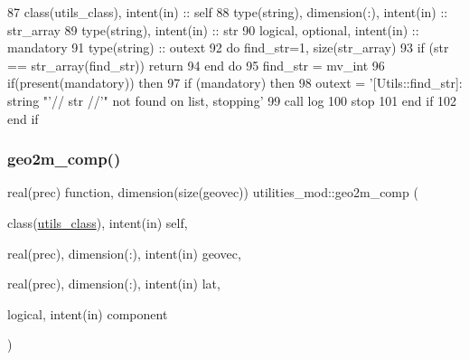 \begin{DoxyCode}
87     \textcolor{keywordtype}{class}(utils\_class), \textcolor{keywordtype}{intent(in)} :: self
88     \textcolor{keywordtype}{type}(string), \textcolor{keywordtype}{dimension(:)}, \textcolor{keywordtype}{intent(in)} :: str\_array
89     \textcolor{keywordtype}{type}(string), \textcolor{keywordtype}{intent(in)} :: str
90     \textcolor{keywordtype}{logical}, \textcolor{keywordtype}{optional}, \textcolor{keywordtype}{intent(in)} :: mandatory
91     \textcolor{keywordtype}{type}(string) :: outext
92     \textcolor{keywordflow}{do} find\_str=1, \textcolor{keyword}{size}(str\_array)
93         \textcolor{keywordflow}{if} (str == str\_array(find\_str)) \textcolor{keywordflow}{return}
94 \textcolor{keywordflow}{    end do}
95     find\_str = mv\_int
96     \textcolor{keywordflow}{if}(\textcolor{keyword}{present}(mandatory)) \textcolor{keywordflow}{then}
97         \textcolor{keywordflow}{if} (mandatory) \textcolor{keywordflow}{then}
98             outext = \textcolor{stringliteral}{'[Utils::find\_str]: string "'}// str //\textcolor{stringliteral}{'" not found on list, stopping'}
99             \textcolor{keyword}{call }log%
100             stop
101 \textcolor{keywordflow}{        end if}
102 \textcolor{keywordflow}{    end if}
\end{DoxyCode}
\mbox{\label{namespaceutilities__mod_aff2244d9152396064656f20f4936a18c}} 
\subsubsection{\texorpdfstring{geo2m\+\_\+comp()}{geo2m\_comp()}}
{\footnotesize\ttfamily real(prec) function, dimension(size(geovec)) utilities\+\_\+mod\+::geo2m\+\_\+comp (\begin{DoxyParamCaption}\item[{class(\mbox{\hyperlink{structutilities__mod_1_1utils__class}{utils\+\_\+class}}), intent(in)}]{self,  }\item[{real(prec), dimension(\+:), intent(in)}]{geovec,  }\item[{real(prec), dimension(\+:), intent(in)}]{lat,  }\item[{logical, intent(in)}]{component }\end{DoxyParamCaption})\hspace{0.3cm}{\ttfamily [private]}}



